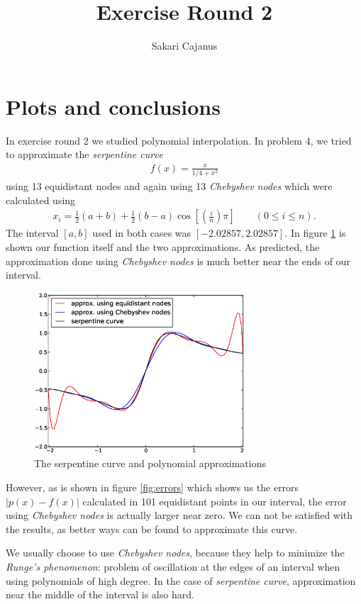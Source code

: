 \documentclass[a4paper,12pt]{scrartcl}
\author{Sakari Cajanus}
\title{Exercise Round 2}{Och samma på English}
\begin{document}
\maketitlepage
\clearpage
{}
\section{Plots and conclusions}
In exercise round 2 we studied polynomial interpolation. In problem 4, we tried to approximate the \emph{serpentine curve}
\begin{align*}
f(x)=\frac{x}{1/4+x^2}
\end{align*}
using 13 equidistant nodes and again using 13 \emph{Chebyshev nodes} which were calculated using
\begin{align*}
	x_i=\frac{1}{2}(a+b) + \frac{1}{2}(b-a)\cos \left[ \left(\frac{i}{n} \right)\pi\right] \qquad(0\le i\le n).
\end{align*}
The interval $[a,b]$ used in both cases was $[-2.02857, 2.02857]$. In figure \ref{fig:curves} is shown our function itself and the two approximations. As predicted, the approximation done using \emph{Chebyshev nodes} is much better near the ends of our interval.
\begin{figure}[h!]
  \centering
    \includegraphics[width=0.7\textwidth]{curves}
  \caption{The serpentine curve and polynomial approximations}
  \label{fig:curves}
\end{figure}
However, as is shown in figure \ref{fig:errors} which shows us the errors $|p(x)-f(x)|$ calculated in 101 equidistant points in our interval, the error using \emph{Chebyshev nodes} is actually larger near zero. We can not be satisfied with the results, as better ways can be found to approximate this curve.

We usually choose to use \emph{Chebyshev nodes}, because they help to minimize the \emph{Runge's phenomenon}: problem of oscillation at the edges of an interval when using polynomials of high degree. In the case of \emph{serpentine curve}, approximation near the middle of the interval is also hard. 
\end{document}
